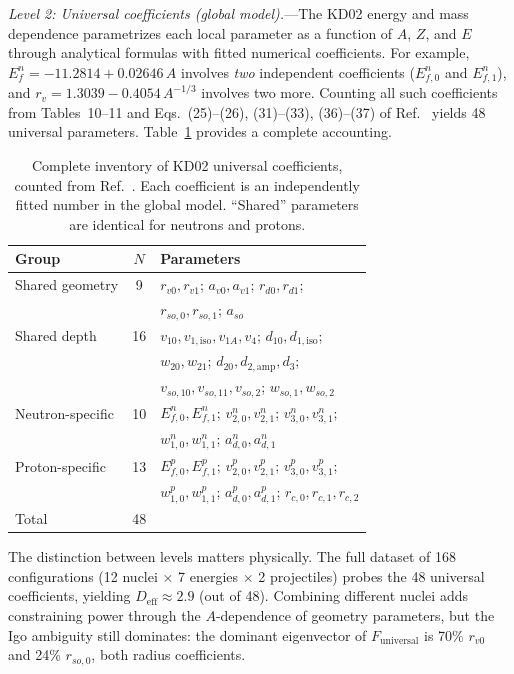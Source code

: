 \documentclass[aps,prl,reprint,superscriptaddress,showpacs,floatfix]{revtex4-2}
\begin{document}
\emph{Level 2: Universal coefficients (global model).}---The KD02 energy and mass dependence parametrizes each local parameter as a function of $A$, $Z$, and $E$ through analytical formulas with fitted numerical coefficients. For example, $E_f^n = -11.2814 + 0.02646\,A$ involves \emph{two} independent coefficients ($E_{f,0}^n$ and $E_{f,1}^n$), and $r_v = 1.3039 - 0.4054\,A^{-1/3}$ involves two more. Counting all such coefficients from Tables~10--11 and Eqs.~(25)--(26), (31)--(33), (36)--(37) of Ref.~\cite{Koning2003} yields 48 universal parameters. Table~\ref{tab:kd02_params} provides a complete accounting.

\begin{table}[h]
\caption{Complete inventory of KD02 universal coefficients, counted from Ref.~\cite{Koning2003}. Each coefficient is an independently fitted number in the global model. ``Shared'' parameters are identical for neutrons and protons.}
\label{tab:kd02_params}
\begin{ruledtabular}
\begin{tabular}{lcl}
Group & $N$ & Parameters \\
\hline
Shared geometry & 9 & $r_{v0}, r_{v1}$; $a_{v0}, a_{v1}$; $r_{d0}, r_{d1}$; \\
 & & $r_{so,0}, r_{so,1}$; $a_{so}$ \\
Shared depth & 16 & $v_{10}, v_{1,\mathrm{iso}}, v_{1A}, v_4$; $d_{10}, d_{1,\mathrm{iso}}$; \\
 & & $w_{20}, w_{21}$; $d_{20}, d_{2,\mathrm{amp}}, d_3$; \\
 & & $v_{so,10}, v_{so,11}, v_{so,2}$; $w_{so,1}, w_{so,2}$ \\
Neutron-specific & 10 & $E_{f,0}^n, E_{f,1}^n$; $v_{2,0}^n, v_{2,1}^n$; $v_{3,0}^n, v_{3,1}^n$; \\
 & & $w_{1,0}^n, w_{1,1}^n$; $a_{d,0}^n, a_{d,1}^n$ \\
Proton-specific & 13 & $E_{f,0}^p, E_{f,1}^p$; $v_{2,0}^p, v_{2,1}^p$; $v_{3,0}^p, v_{3,1}^p$; \\
 & & $w_{1,0}^p, w_{1,1}^p$; $a_{d,0}^p, a_{d,1}^p$; $r_{c,0}, r_{c,1}, r_{c,2}$ \\
\hline
Total & 48 & \\
\end{tabular}
\end{ruledtabular}
\end{table}

The distinction between levels matters physically. The full dataset of 168 configurations (12 nuclei $\times$ 7 energies $\times$ 2 projectiles) probes the 48 universal coefficients, yielding $D_\mathrm{eff} \approx 2.9$ (out of 48). Combining different nuclei adds constraining power through the $A$-dependence of geometry parameters, but the Igo ambiguity still dominates: the dominant eigenvector of $F_\mathrm{universal}$ is 70\% $r_{v0}$ and 24\% $r_{so,0}$, both radius coefficients.
\end{document}
